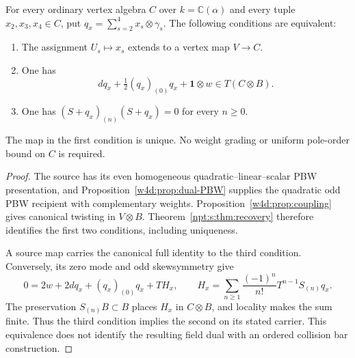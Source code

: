 \begin{corollary}
\label{w4d:cor:zero-mode-recognition}
For every ordinary vertex algebra $C$ over $k=\mathbb C(\alpha)$ and
every tuple $x_2,x_3,x_4\in C$, put
$q_x=\sum_{s=2}^4x_s\otimes\gamma_s$. The following conditions
are equivalent:
\begin{enumerate}
\item The assignment $U_s\mapsto x_s$ extends to a vertex map $V\to C$.
\item One has
\[
 dq_x+\tfrac12(q_x)_{(0)}q_x+\mathbf1\otimes w
       \in T(C\otimes B).
\]
\item One has $(S+q_x)_{(n)}(S+q_x)=0$ for every $n\geq0$.
\end{enumerate}
The map in the first condition is unique. No weight grading or uniform
pole-order bound on $C$ is required.
\end{corollary}
\begin{proof}
The source has its even homogeneous quadratic--linear--scalar PBW
presentation, and Proposition~\ref{w4d:prop:dual-PBW} supplies the
quadratic odd PBW recipient with complementary weights.
Proposition~\ref{w4d:prop:coupling} gives canonical twisting in $V\otimes B$.
Theorem~\ref{npt:s:thm:recovery} therefore identifies the first two
conditions, including uniqueness.

A source map carries the canonical full identity to the third condition.
Conversely, its zero mode and odd skewsymmetry give
\[
 0=2w+2dq_x+(q_x)_{(0)}q_x+TH_x,
 \qquad H_x=\sum_{n\geq1}\frac{(-1)^n}{n!}
                         T^{n-1}S_{(n)}q_x.
\]
The preservation $S_{(n)}B\subset B$ places $H_x$ in $C\otimes B$,
and locality makes the sum finite. Thus the third condition implies
the second on its stated carrier. This equivalence does not identify
the resulting field dual with an ordered collision bar construction.
\end{proof}

